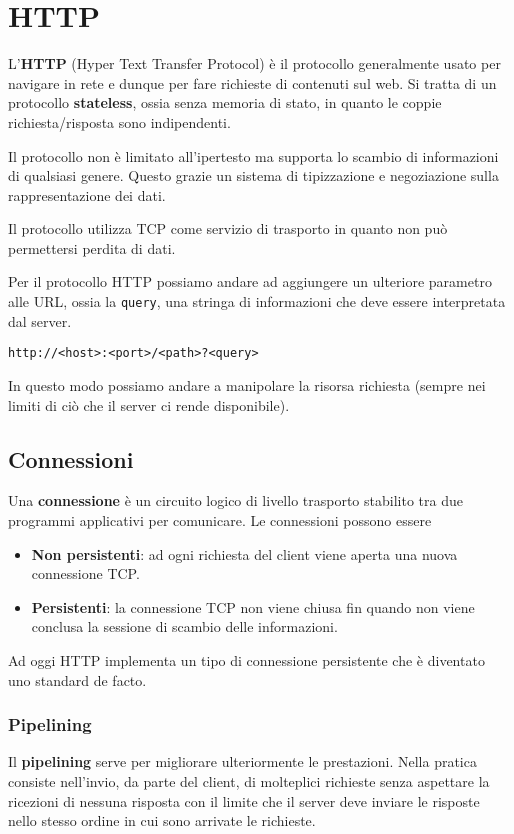 \section{HTTP}
L'\textbf{HTTP} (Hyper Text Transfer Protocol) è il protocollo 
generalmente usato per navigare in rete e dunque per fare richieste di 
contenuti sul web. Si tratta di un protocollo \textbf{stateless}, ossia
senza memoria di stato, in quanto le coppie richiesta/risposta sono
indipendenti.

Il protocollo non è limitato all'ipertesto ma supporta lo scambio di 
informazioni di qualsiasi genere. Questo grazie un sistema di 
tipizzazione e negoziazione sulla rappresentazione dei dati.

Il protocollo utilizza TCP come servizio di trasporto in quanto non può
permettersi perdita di dati.

Per il protocollo HTTP possiamo andare ad aggiungere un ulteriore 
parametro alle URL, ossia la \verb|query|, una stringa di informazioni 
che deve essere interpretata dal server.
\begin{center}
	\verb|http://<host>:<port>/<path>?<query>|
\end{center}
In questo modo possiamo andare a manipolare la risorsa richiesta 
(sempre nei limiti di ciò che il server ci rende disponibile).

\subsection{Connessioni}
Una \textbf{connessione} è un circuito logico di livello trasporto 
stabilito tra due programmi applicativi per comunicare. Le connessioni 
possono essere
\begin{itemize}
	\item \textbf{Non persistenti}: ad ogni richiesta del client viene 
		aperta una nuova connessione TCP.
	\item \textbf{Persistenti}: la connessione TCP non viene chiusa fin
		quando non viene conclusa la sessione di scambio delle 
		informazioni.
\end{itemize}
Ad oggi HTTP implementa un tipo di connessione persistente che è 
diventato uno standard de facto.

\subsubsection{Pipelining}
Il \textbf{pipelining} serve per migliorare ulteriormente le 
prestazioni. Nella pratica consiste nell'invio, da parte del client,
di molteplici richieste senza aspettare la ricezioni di nessuna 
risposta con il limite che il server deve inviare le risposte nello 
stesso ordine in cui sono arrivate le richieste.

